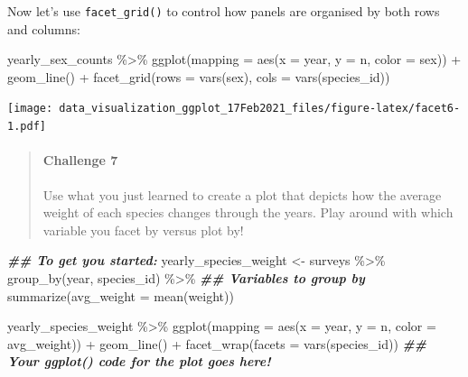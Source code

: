 \documentclass[
]{article}
\newenvironment{Shaded}{\begin{snugshade}}{\end{snugshade}}
\newcommand{\AttributeTok}[1]{\textcolor[rgb]{0.77,0.63,0.00}{#1}}
\newcommand{\DocumentationTok}[1]{\textcolor[rgb]{0.56,0.35,0.01}{\textbf{\textit{#1}}}}
\newcommand{\FunctionTok}[1]{\textcolor[rgb]{0.00,0.00,0.00}{#1}}
\newcommand{\NormalTok}[1]{#1}
\newcommand{\OtherTok}[1]{\textcolor[rgb]{0.56,0.35,0.01}{#1}}
\newcommand{\SpecialCharTok}[1]{\textcolor[rgb]{0.00,0.00,0.00}{#1}}
\begin{document}
Now let's use \texttt{facet\_grid()} to control how panels are organised
by both rows and columns:

\begin{Shaded}
\begin{Highlighting}[]
\NormalTok{yearly\_sex\_counts }\SpecialCharTok{\%\textgreater{}\%} 
  \FunctionTok{ggplot}\NormalTok{(}\AttributeTok{mapping =} \FunctionTok{aes}\NormalTok{(}\AttributeTok{x =}\NormalTok{ year, }\AttributeTok{y =}\NormalTok{ n, }\AttributeTok{color =}\NormalTok{ sex)) }\SpecialCharTok{+}
    \FunctionTok{geom\_line}\NormalTok{() }\SpecialCharTok{+}
    \FunctionTok{facet\_grid}\NormalTok{(}\AttributeTok{rows =} \FunctionTok{vars}\NormalTok{(sex), }\AttributeTok{cols =}  \FunctionTok{vars}\NormalTok{(species\_id))}
\end{Highlighting}
\end{Shaded}

\texttt{[image: data\_visualization\_ggplot\_17Feb2021\_files/figure-latex/facet6-1.pdf]}

\begin{quote}
\mbox{}%
\hypertarget{challenge-7}{%
\paragraph{Challenge 7}\label{challenge-7}}

Use what you just learned to create a plot that depicts how the average
weight of each species changes through the years. Play around with which
variable you facet by versus plot by!
\end{quote}

\begin{Shaded}
\begin{Highlighting}[]
\DocumentationTok{\#\# To get you started:  }
\NormalTok{yearly\_species\_weight }\OtherTok{\textless{}{-}}\NormalTok{ surveys }\SpecialCharTok{\%\textgreater{}\%} 
  \FunctionTok{group\_by}\NormalTok{(year, species\_id) }\SpecialCharTok{\%\textgreater{}\%}
  \DocumentationTok{\#\# Variables to group by}
  \FunctionTok{summarize}\NormalTok{(}\AttributeTok{avg\_weight =} \FunctionTok{mean}\NormalTok{(weight))}

\NormalTok{yearly\_species\_weight }\SpecialCharTok{\%\textgreater{}\%}
  \FunctionTok{ggplot}\NormalTok{(}\AttributeTok{mapping =} \FunctionTok{aes}\NormalTok{(}\AttributeTok{x =}\NormalTok{ year, }\AttributeTok{y =}\NormalTok{ n, }\AttributeTok{color =}\NormalTok{ avg\_weight)) }\SpecialCharTok{+}
    \FunctionTok{geom\_line}\NormalTok{() }\SpecialCharTok{+}
    \FunctionTok{facet\_wrap}\NormalTok{(}\AttributeTok{facets =}  \FunctionTok{vars}\NormalTok{(species\_id))}
\DocumentationTok{\#\# Your ggplot() code for the plot goes here!}
\end{Highlighting}
\end{Shaded}
\end{document}
